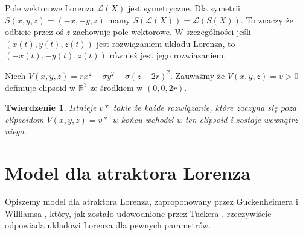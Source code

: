 \documentclass[12pt]{report}
\newtheorem{theorem}{Twierdzenie}
\newcommand{\R}{\mathbb{R}}
\begin{document}
	\par Pole wektorowe Lorenza $\mathcal{L}(X)$ jest symetryczne. Dla symetrii $S(x, y, z) = (-x, -y, z)$ mamy $S(\mathcal{L}(X)) = \mathcal{L}(S(X))$. To znaczy że odbicie przez oś $z$ zachowuje pole wektorowe. W szczególności jeśli $(x(t), y(t), z(t))$ jest rozwiązaniem układu Lorenza, to $(-x(t), -y(t), z(t))$ również jest jego rozwiązaniem.
	\\
	\par Niech $V(x, y, z) = rx^2 + \sigma y^2 + \sigma (z - 2r)^2$. Zauważmy że $V(x, y, z) = v > 0$ definiuje elipsoid w $\R^3$ ze środkiem w $(0, 0, 2r)$.
	\begin{theorem}
		Istnieje $v*$ takie że każde rozwiązanie, które zaczyna się poza elipsoidom $V(x, y, z) = v*$ w końcu wchodzi w ten elipsoid i zostaje wewnątrz niego.
	\end{theorem}

	\section{Model dla atraktora Lorenza}
	\par Opiszemy model dla atraktora Lorenza, zaproponowany przez Guckenheimera i Williamsa \cite{GW}, który, jak zostało udowodnione przez Tuckera \cite{Tucker}, rzeczywiście odpowiada układowi Lorenza dla pewnych parametrów.
	
\end{document}
